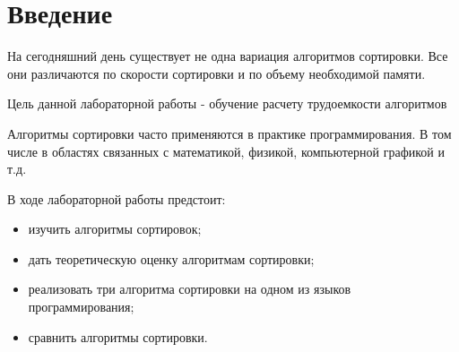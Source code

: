 \chapter*{Введение}




На сегодняшний день существует не одна вариация алгоритмов сортировки. Все они различаются по скорости сортировки и по объему необходимой памяти. 

Цель данной лабораторной работы - обучение расчету трудоемкости алгоритмов


Алгоритмы сортировки часто применяются в практике программирования. В том числе в областях связанных с математикой, физикой, компьютерной графикой и т.д.



В ходе лабораторной работы предстоит:
\begin{itemize}
	\item изучить алгоритмы сортировок;
	\item дать теоретическую оценку алгоритмам сортировки;
	\item реализовать три алгоритма сортировки на одном из языков программирования;  
	\item сравнить алгоритмы сортировки.
\end{itemize}
